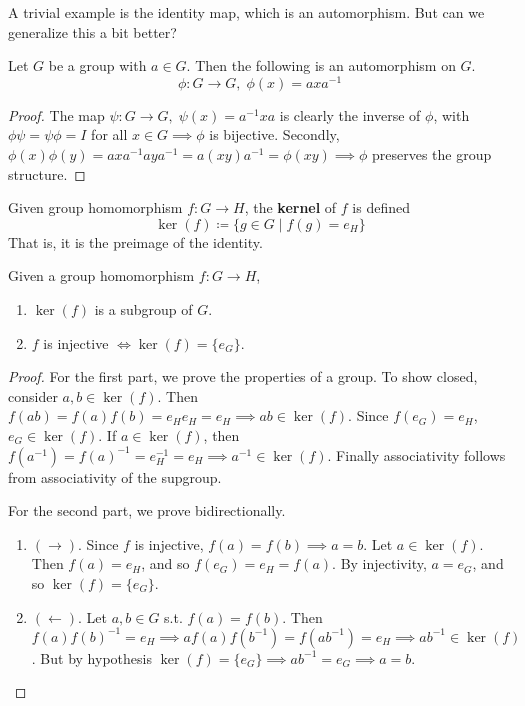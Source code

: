   A trivial example is the identity map, which is an automorphism. But can we generalize this a bit better? 

  \begin{theorem}
    Let $G$ be a group with $a \in G$. Then the following is an automorphism on $G$. 
    \begin{equation}
      \phi: G \longrightarrow G, \; \phi (x) = a x a^{-1}
    \end{equation}
  \end{theorem}
  \begin{proof}
    The map $\psi: G \longrightarrow G, \; \psi(x) = a^{-1} x a$ is clearly the inverse of $\phi$, with $\phi \psi = \psi \phi = I$ for all $x \in G \implies \phi$ is bijective. Secondly, $\phi(x) \phi(y) = a x a^{-1} a y a^{-1} = a (x y) a ^{-1} = \phi (x y) \implies \phi$ preserves the group structure. 
  \end{proof} 

  \begin{definition}[Kernel]
    Given group homomorphism $f: G \rightarrow H$, the \textbf{kernel} of $f$ is defined 
    \begin{equation}
      \ker(f) \coloneqq \{g \in G \mid f(g) = e_H\}
    \end{equation}
    That is, it is the preimage of the identity. 
  \end{definition} 

  \begin{theorem}
    Given a group homomorphism $f: G \rightarrow H$, 
    \begin{enumerate}
      \item $\ker(f)$ is a subgroup of $G$.  
      \item $f$ is injective $\iff \ker(f) = \{e_G\}$. 
    \end{enumerate}
  \end{theorem}
  \begin{proof}
    For the first part, we prove the properties of a group. To show closed, consider $a, b \in \ker(f)$. Then $f(ab) = f(a) f(b) = e_H e_H = e_H \implies ab \in \ker(f)$. Since $f(e_G) = e_H$, $e_G \in \ker(f)$. If $a \in \ker(f)$, then $f(a^{-1}) = f(a)^{-1} = e_H^{-1} = e_H \implies a^{-1} \in \ker(f)$. Finally associativity follows from associativity of the supgroup. 

    For the second part, we prove bidirectionally. 
    \begin{enumerate}
      \item $(\rightarrow)$. Since $f$ is injective, $f(a) = f(b) \implies a = b$. Let $a \in \ker(f)$. Then $f(a) = e_H$, and so $f(e_G) = e_H = f(a)$. By injectivity, $a = e_G$, and so $\ker(f) = \{e_G\}$. 
      \item $(\leftarrow)$. Let $a, b \in G$ s.t. $f(a) = f(b)$. Then $f(a) f(b)^{-1} = e_H \implies af(a) f(b^{-1}) = f(a b^{-1}) = e_H \implies ab^{-1} \in \ker(f)$. But by hypothesis $\ker(f) = \{e_G\} \implies ab^{-1} = e_G \implies a = b$. 
    \end{enumerate}
  \end{proof}

